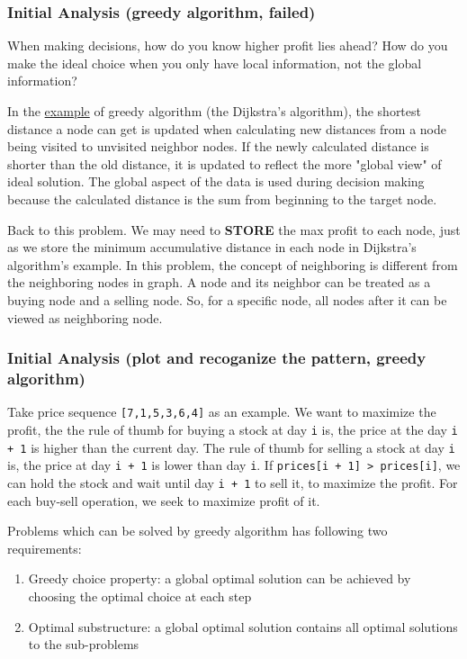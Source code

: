 \documentclass[12pt]{article}
\begin{document}
\subsubsection{Initial Analysis (greedy algorithm, failed)}
\label{sec:orgebfefbf}
When making decisions, how do you know higher profit lies ahead? How do you make the ideal choice when you only have local information, not the global information?

In the \href{https://brilliant.org/wiki/greedy-algorithm/}{example} of greedy algorithm (the Dijkstra's algorithm), the shortest distance a node can get is updated when calculating new distances from a node being visited to unvisited neighbor nodes. If the newly calculated distance is shorter than the old distance, it is updated to reflect the more "global view" of ideal solution. The global aspect of the data is used during decision making because the calculated distance is the sum from beginning to the target node.

Back to this problem. We may need to \textbf{STORE} the max profit to each node, just as we store the minimum accumulative distance in each node in Dijkstra's algorithm's example. In this problem, the concept of neighboring is different from the neighboring nodes in graph. A node and its neighbor can be treated as a buying node and a selling node. So, for a specific node, all nodes after it can be viewed as neighboring node.
\subsubsection{Initial Analysis (plot and recoganize the pattern, greedy algorithm)}
\label{sec:org83ab0f3}
Take price sequence \texttt{[7,1,5,3,6,4]} as an example. We want to maximize the profit, the the rule of thumb for buying a stock at day \texttt{i} is, the price at the day \texttt{i + 1} is higher than the current day. The rule of thumb for selling a stock at day \texttt{i} is, the price at day \texttt{i + 1} is lower than day \texttt{i}. If \texttt{prices[i + 1] > prices[i]}, we can hold the stock and wait until day \texttt{i + 1} to sell it, to maximize the profit. For each buy-sell operation, we seek to maximize profit of it.

Problems which can be solved by greedy algorithm has following two requirements:
\begin{enumerate}
\item Greedy choice property: a global optimal solution can be achieved by choosing the optimal choice at each step
\item Optimal substructure: a global optimal solution contains all optimal solutions to the sub-problems
\end{enumerate}
\end{document}

